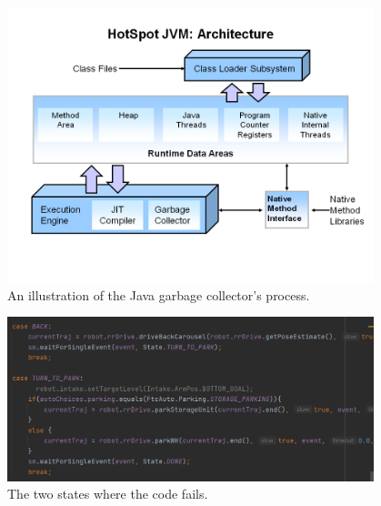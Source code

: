 \begin{figure}[htp]
\centering
\includegraphics[width=0.95\textwidth, angle=0]{Meetings/February/02-24-22/2-24-22 1.PNG}
\caption{An illustration of the Java garbage collector's process.}
\label{fig:022422_1}
\end{figure}

\begin{figure}[htp]
\centering
\includegraphics[width=0.95\textwidth, angle=0]{Meetings/February/02-24-22/2-24-22 2.PNG}
\caption{The two states where the code fails.}
\label{fig:022422_2}
\end{figure}



